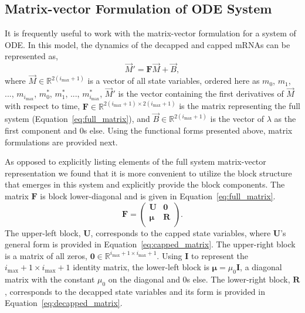\documentclass[review]{elsarticle}
\newcommand{\imax}{\ensuremath{i_{\max}}\xspace}
\let\bs\boldsymbol
\begin{document}
\subsection{Matrix-vector Formulation of ODE System}
It is frequently useful to work with the matrix-vector formulation for a system of ODE.
In this model, the dynamics of the decapped and capped mRNAs can be represented as,
\begin{equation}\label{eq:matrix_full}\vec{M}'=\boldsymbol{F}\vec{M}+\vec{B},
\end{equation} 
where $\vec{M}\in\mathbb{R}^{2(\imax+1)}$ is a vector of all state variables, ordered here as $m_0$, $m_1$, ..., $m_{\imax}$, $m^*_0$, $m^*_1$, ..., $m^*_{\imax}$, $\vec{M}'$ is the vector containing the first derivatives of $\vec{M}$ with respect to time, $\bs{F}\in\mathbb{R}^{2(\imax+1)\times 2(\imax+1)}$ is the matrix representing the full system (Equation~\ref{eq:full_matrix}), and $\vec{B}\in\mathbb{R}^{2(\imax+1)}$ is the vector of $\lambda$ as the first component and 0s else.
Using the functional forms presented above, matrix formulations are provided next.

As opposed to explicitly listing elements of the full system matrix-vector representation we found that it is more convenient to utilize the block structure that emerges in this system and explicitly provide the block components.
The matrix $\bs{F}$ is block lower-diagonal and is given in Equation~\ref{eq:full_matrix}.
\begin{equation}
\label{eq:full_matrix}
\bs{F}=\left(\begin{array}{cc}
\bs{U} & \bs{0} \\
\bs{\mu} & \bs{R} \\
\end{array} \right).
\end{equation}
The upper-left block, $\bs{U}$, corresponds to the capped state variables, where $\bs{U}$'s general form is provided in Equation~\ref{eq:capped_matrix}.
The upper-right block is a matrix of all zeros, $\bs{0}\in\mathbb{R}^{\imax+1\times \imax+1}$.
Using $\bs{I}$ to represent the $\imax+1\times \imax+1$ identity matrix, the lower-left block is $\bs{\mu}=\mu_0\bs{I}$, a diagonal matrix with the constant $\mu_0$ on the diagonal and 0s else.
The lower-right block, $\bs{R}$, corresponds to the decapped state variables and its form is provided in Equation~\ref{eq:decapped_matrix}.
\end{document}
